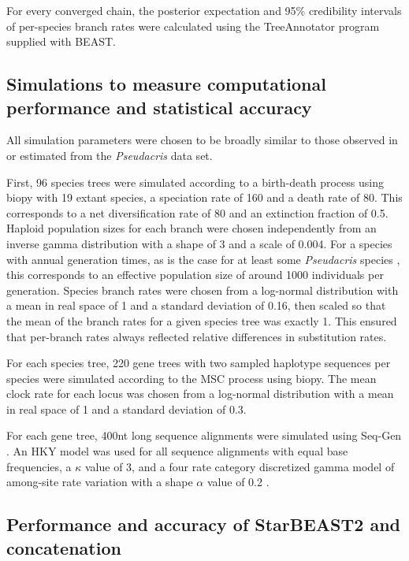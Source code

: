 \documentclass[nogrid]{MBE}%
\begin{document}
For every converged chain, the posterior expectation and 95\% credibility
intervals of per-species branch rates were calculated using the TreeAnnotator
program supplied with BEAST.

\subsection{Simulations to measure computational performance and statistical accuracy}

All simulation parameters were chosen to be broadly similar to those observed in
or estimated from the \textit{Pseudacris} data set.

First, 96 species trees were simulated according to a birth-death process
\citep{Gernhard2008769} using biopy with 19 extant species, a speciation rate of
160 and a death rate of 80. This corresponds to a net diversification rate
of 80 and an extinction fraction of 0.5. Haploid population sizes
for each branch were chosen independently from an inverse gamma distribution
with a shape of 3 and a scale of 0.004. For a species with annual generation
times, as is the case for at least some \textit{Pseudacris} species
\citep{10.2307/1446044}, this corresponds to an effective population size
of around 1000 individuals per generation. Species branch rates were chosen from a
log-normal distribution with a mean in real space of 1 and a standard
deviation of 0.16, then scaled so that the mean of the branch rates for a given
species tree was exactly 1. This ensured that per-branch rates always reflected
relative differences in substitution rates.

For each species tree, 220 gene trees with two sampled haplotype sequences per
species were simulated according to the MSC process using biopy. The mean clock
rate for each locus was chosen from a log-normal distribution with a mean in
real space of 1 and a standard deviation of 0.3.

For each gene tree, 400nt long sequence alignments were simulated using Seq-Gen
\citep{Rambaut01061997}. An HKY model was used for all sequence alignments with
equal base frequencies, a $\kappa$ value of 3, and a four rate category
discretized gamma model of among-site rate variation with a shape $\alpha$ value
of 0.2 \citep{Yang1994}.

\subsection{Performance and accuracy of StarBEAST2 and concatenation}
\end{document}
